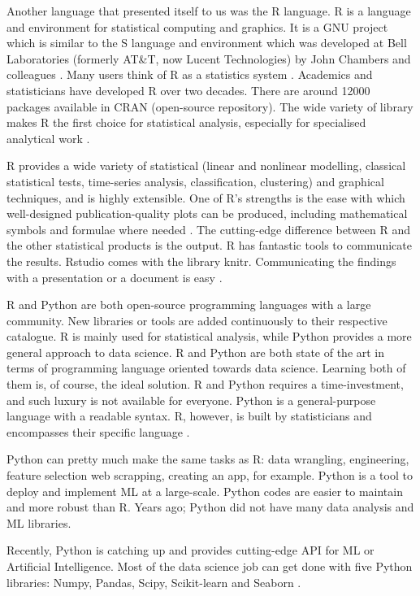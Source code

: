 	Another language that presented itself to us was the R language. R is a language and environment for statistical computing and graphics. It is a GNU project which is similar to the S language and environment which was developed at Bell Laboratories (formerly AT\&T, now Lucent Technologies) by John Chambers and colleagues \cite{r_project}. Many users think of R as a statistics system \cite{r_project}. Academics and statisticians have developed R over two decades. There are around 12000 packages available in CRAN (open-source repository). The wide variety of library makes R the first choice for statistical analysis, especially for specialised analytical work \cite{r_vs_py}.
	
	R provides a wide variety of statistical (linear and nonlinear modelling, classical statistical tests, time-series analysis, classification, clustering) and graphical techniques, and is highly extensible. One of R's strengths is the ease with which well-designed publication-quality plots can be produced, including mathematical symbols and formulae where needed \cite{r_project}. The cutting-edge difference between R and the other statistical products is the output. R has fantastic tools to communicate the results. Rstudio comes with the library knitr. Communicating the findings with a presentation or a document is easy \cite{r_vs_py}.
	
	R and Python are both open-source programming languages with a large community. New libraries or tools are added continuously to their respective catalogue. R is mainly used for statistical analysis, while Python provides a more general approach to data science.
	R and Python are both state of the art in terms of programming language oriented towards data science. Learning both of them is, of course, the ideal solution. R and Python requires a time-investment, and such luxury is not available for everyone. Python is a general-purpose language with a readable syntax. R, however, is built by statisticians and encompasses their specific language \cite{r_vs_py}.
	
	Python can pretty much make the same tasks as R: data wrangling, engineering, feature selection web scrapping, creating an app, for example. Python is a tool to deploy and implement ML at a large-scale. Python codes are easier to maintain and more robust than R. Years ago; Python did not have many data analysis and ML libraries. 
	
	Recently, Python is catching up and provides cutting-edge API for ML or Artificial Intelligence. Most of the data science job can get done with five Python libraries: Numpy, Pandas, Scipy, Scikit-learn and Seaborn \cite{r_vs_py}.
	
